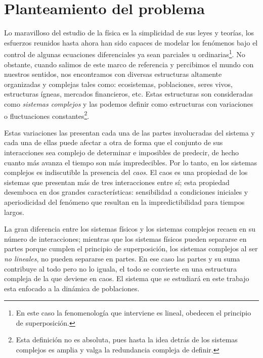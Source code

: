 \documentclass[11pt,a4paper]{article}
\begin{document}
\section{Planteamiento del problema}



Lo maravilloso del estudio de la física es la simplicidad de sus leyes y teorías, los esfuerzos reunidos hasta ahora han sido capaces de modelar los fenómenos bajo el control de algunas ecuaciones diferenciales ya sean parciales u ordinarias\footnote{En este caso la fenomenología que interviene es lineal, obedecen el principio de superposición.}. No obstante, cuando salimos de este marco de referencia y percibimos el mundo con nuestros sentidos, nos encontramos con diversas estructuras altamente organizadas y complejas tales como: ecosistemas, poblaciones, seres vivos, estructuras ígneas, mercados financieros, etc. Estas estructuras son consideradas como \emph{sistemas complejos} y  las podemos definir como estructuras con variaciones o fluctuaciones constantes\footnote{Esta definición no es absoluta, pues hasta la idea detrás de los sistemas complejos es amplia y valga la redundancia compleja de definir.}.

Estas variaciones las presentan cada una de las partes involucradas del sistema y cada una de ellas puede afectar a otra de forma que el conjunto de sus interacciones sea complejo de determinar e imposibles de predecir, de hecho cuanto más avanza el tiempo son más impredecibles. Por lo tanto, en los sistemas complejos es indiscutible la presencia del \emph{caos}. El caos es una propiedad de los sistemas que presentan más de tres interacciones entre sí; esta propiedad desemboca en dos grandes características: sensibilidad a condiciones iniciales y aperiodicidad del fenómeno que resultan en la impredictibilidad para tiempos largos.


La gran diferencia entre los sistemas físicos y los sistemas complejos recaen en su número de interacciones; mientras que los sistemas físicos pueden separarse en partes porque cumplen el principio de superposición, los sistemas complejos al ser \emph{no lineales}, no pueden separarse en partes. En ese caso las partes y su suma contribuye al todo pero no lo iguala, el todo se convierte en una estructura compleja de la que deviene en caos. El sistema que se estudiará en este trabajo esta enfocado a la dinámica de poblaciones. 
\end{document}
